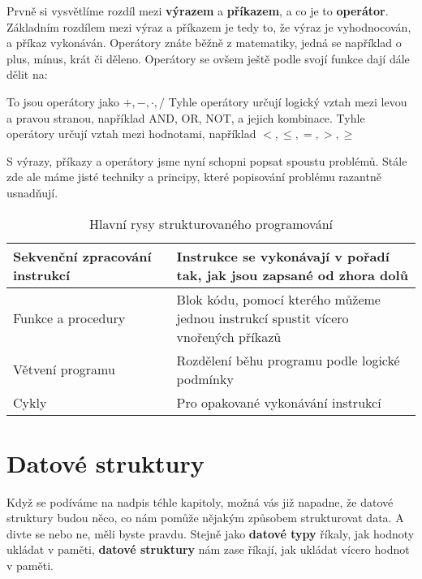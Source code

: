 Prvně si vysvětlíme rozdíl mezi \textbf{výrazem} a \textbf{příkazem}, a co je to \textbf{operátor}. Základním rozdílem mezi výraz a příkazem je tedy to, že výraz je vyhodnocován, a příkaz vykonáván. Operátory znáte běžně z matematiky, jedná se například o plus, mínus, krát či děleno. Operátory se ovšem ještě podle svojí funkce dají dále dělit na:

\begin{enumerate}
	 To jsou operátory jako $+, -, \cdot, /$
	 Tyhle operátory určují logický vztah mezi levou a pravou stranou, například AND, OR, NOT, a jejich kombinace.
	 Tyhle operátory určují vztah mezi hodnotami, například $<, \le, =, >, \ge$
\end{enumerate}

S výrazy, příkazy a operátory jsme nyní schopni popsat spoustu problémů. Stále zde ale máme jisté techniky a principy, které popisování problému razantně usnadňují.

\begin{table}[h!]
	\caption{Hlavní rysy strukturovaného programování}
	\label{table:strukturovane}
	\begin{tabular}{|m{0.4\linewidth} | m{0.6\linewidth} |}
		\hline
		Sekvenční zpracování instrukcí & Instrukce se vykonávají v pořadí tak, jak jsou zapsané od zhora dolů               \\ \hline
		Funkce a procedury             & Blok kódu, pomocí kterého můžeme jednou instrukcí spustit vícero vnořených příkazů \\ \hline
		Větvení programu               & Rozdělení běhu programu podle logické podmínky                                     \\ \hline
		Cykly                          & Pro opakované vykonávání instrukcí                                                 \\ \hline
	\end{tabular}
\end{table}

\section{Datové struktury}
Když se podíváme na nadpis téhle kapitoly, možná vás již napadne, že datové struktury budou něco, co nám pomůže nějakým způsobem strukturovat data. A divte se nebo ne, měli byste pravdu. Stejně jako \textbf{datové typy} říkaly, jak hodnoty ukládat v paměti, \textbf{datové struktury} nám zase říkají, jak ukládat vícero hodnot v paměti.

